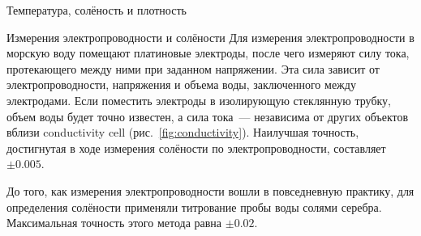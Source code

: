\begin{chapter}{Температура, солёность и плотность}
\begin{section}{Измерения электропроводности и солёности}
Для измерения электропроводности в морскую воду помещают платиновые электроды,
после чего измеряют силу тока, протекающего между ними при заданном напряжении.
Эта сила зависит от электропроводности, напряжения и объема воды, заключенного 
между электродами. Если поместить электроды в изолирующую стеклянную трубку,
объем воды будет точно известен, а сила тока~--- независима от других объектов
вблизи conductivity cell (рис.~\ref{fig:conductivity}). Наилучшая точность, 
достигнутая в ходе измерения солёности по электропроводности, 
составляет~$\pm 0.005$.
% 

До того, как измерения электропроводности вошли в повседневную практику,
для определения солёности применяли титрование пробы воды
солями серебра. Максимальная точность этого метода равна $\pm 0.02$.
%


\end{section}
\end{chapter}
